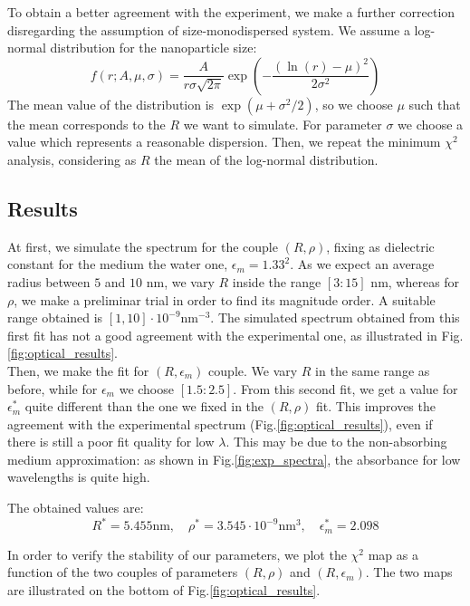 \documentclass[prb,twocolumn]{revtex4-1}
\begin{document}
To obtain a better agreement with the experiment, we make a further correction disregarding the assumption of size-monodispersed system. We assume a log-normal distribution for the nanoparticle size:
\begin{equation}
f(r;A,\mu,\sigma) = \frac{A}{r\sigma\sqrt{2\pi}}\exp(-\frac{(\ln(r)-\mu)^2}{2\sigma^2})
\label{eqn:log_normal}
\end{equation}
The mean value of the distribution is $\exp(\mu+\sigma^2/2)$, so we choose $\mu$ such that the mean corresponds to the $R$ we want to simulate. For parameter $\sigma$ we choose a value which represents a reasonable dispersion. 
Then, we  repeat the minimum $\chi^2$ analysis, considering as $R$ the mean of the log-normal distribution. 



\subsection{Results}


At first, we simulate the spectrum for the couple $(R,\rho)$, fixing as dielectric constant for the medium the water one, $\epsilon_m = 1.33^2$. As we expect an average radius between $5$ and $10$ nm, we vary $R$ inside the range $[3:15]$ nm, whereas for $\rho$, we make a preliminar trial in order to find its magnitude order. A suitable range obtained is $[1,10]\cdot 10^{-9} \text{nm}^{-3}$. The simulated spectrum obtained from this first fit has not a good agreement with the experimental one, as illustrated in Fig.\ref{fig:optical_results}. \\
Then, we make the fit for $(R,\epsilon_m)$ couple. We vary $R$ in the same range as before, while for $\epsilon_m$ we choose $[1.5:2.5]$.
From this second fit, we get a value for $\epsilon_m^*$ quite different than the one we fixed in the $(R,\rho)$ fit. This improves the agreement with the experimental spectrum (Fig.\ref{fig:optical_results}), even if there is still a poor fit quality for low $\lambda$. This may be due to the non-absorbing medium approximation: as shown in Fig.\ref{fig:exp_spectra}, the absorbance for low wavelengths is quite high.

The obtained values are:
\begin{equation*}
    R^* = 5.455  \text{nm}, \quad \rho^* = 3.545 \cdot 10^{-9} \text{nm}^3 , \quad \epsilon_m^* = 2.098
\end{equation*}

In order to verify the stability of our parameters, we plot the $\chi^2$ map as a function of the two couples of parameters \( (R,\rho) \) and \( (R,\epsilon_m) \). The two maps are illustrated on the bottom of Fig.\ref{fig:optical_results}.
\end{document}
